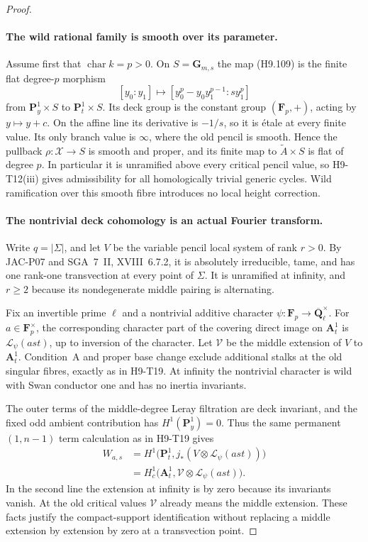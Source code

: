 \begin{proof}
\paragraph{The wild rational family is smooth over its parameter.}
Assume first that $\operatorname{char}k=p>0$. On
$S=\mathbf G_{m,s}$ the map (H9.109) is the finite flat
degree-$p$ morphism
\[
 [y_0:y_1]\longmapsto
      [y_0^p-y_0y_1^{p-1}:s y_1^p]
\]
from $\mathbf P^1_y\times S$ to
$\mathbf P^1_t\times S$. Its deck group is the constant
group $(\mathbf F_p,+)$, acting by $y\mapsto y+c$.
On the affine line its derivative is $-1/s$, so it is
\'etale at every finite value. Its only branch value is
$\infty$, where the old pencil is smooth. Hence the
pullback $\rho:\mathscr X\to S$ is smooth and proper, and its
finite map to $\widetilde A\times S$ is flat of degree
$p$. In particular it is unramified above every critical
pencil value, so H9-T12(iii) gives admissibility for all
homologically trivial generic cycles. Wild ramification
over this smooth fibre introduces no local height
correction.

\paragraph{The nontrivial deck cohomology is an actual Fourier transform.}
Write $q=|\Sigma|$, and let $V$ be the variable pencil
local system of rank $r>0$. By JAC-P07 and SGA~7~II,
XVIII~6.7.2, it is absolutely irreducible, tame, and has
one rank-one transvection at every point of $\Sigma$.
It is unramified at infinity, and $r\ge2$ because its
nondegenerate middle pairing is alternating.

Fix an invertible prime $\ell$ and a nontrivial additive
character $\psi:\mathbf F_p\to
\overline{\mathbf Q}_\ell^\times$. For $a\in\mathbf F_p^\times$,
the corresponding character part of the covering direct
image on $\mathbf A^1_t$ is
$\mathcal L_\psi(a s t)$, up to inversion of the character.
Let $\mathcal V$ be the middle extension of $V$ to
$\mathbf A^1_t$. Condition~A and proper base change exclude
additional stalks at the old singular fibres, exactly as
in H9-T19. At infinity the nontrivial character is wild
with Swan conductor one and has no inertia invariants.

The outer terms of the middle-degree Leray filtration
are deck invariant, and the fixed odd ambient contribution
has $H^1(\mathbf P^1_y)=0$. Thus the same permanent
$(1,n-1)$ term calculation as in H9-T19 gives
\[
 \begin{split}
 W_{a,s}
   &=H^1\bigl(\mathbf P^1_t,
       j_*(V\otimes\mathcal L_\psi(a s t))\bigr)\\
   &=H^1_c\bigl(\mathbf A^1_t,
                    \mathcal V\otimes\mathcal L_\psi(a s t)\bigr).
 \end{split}                                                  \tag{H9.112}
\]
In the second line the extension at infinity is by zero
because its invariants vanish. At the old critical values
$\mathcal V$ already means the middle extension. These
facts justify the compact-support identification without
replacing a middle extension by extension by zero at a
transvection point.


\end{proof}
